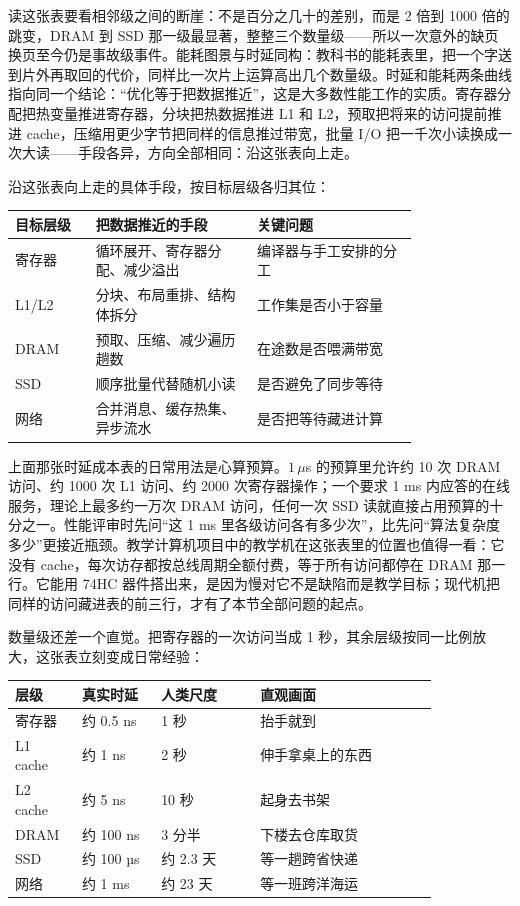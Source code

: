读这张表要看相邻级之间的断崖：不是百分之几十的差别，而是 2 倍到 1000 倍的跳变，DRAM 到 SSD 那一级最显著，整整三个数量级——所以一次意外的缺页换页至今仍是事故级事件。能耗图景与时延同构：教科书的能耗表里，把一个字送到片外再取回的代价，同样比一次片上运算高出几个数量级。时延和能耗两条曲线指向同一个结论：“优化等于把数据推近”，这是大多数性能工作的实质。寄存器分配把热变量推进寄存器，分块把热数据推进 L1 和 L2，预取把将来的访问提前推进 cache，压缩用更少字节把同样的信息推过带宽，批量 I/O 把一千次小读换成一次大读——手段各异，方向全部相同：沿这张表向上走。

沿这张表向上走的具体手段，按目标层级各归其位：

\begin{longtable}{L{0.16\linewidth}L{0.32\linewidth}L{0.32\linewidth}}
\toprule
目标层级 & 把数据推近的手段 & 关键问题 \\
\midrule
寄存器 & 循环展开、寄存器分配、减少溢出 & 编译器与手工安排的分工 \\\tablerowrule
L1/L2 & 分块、布局重排、结构体拆分 & 工作集是否小于容量 \\\tablerowrule
DRAM & 预取、压缩、减少遍历趟数 & 在途数是否喂满带宽 \\\tablerowrule
SSD & 顺序批量代替随机小读 & 是否避免了同步等待 \\\tablerowrule
网络 & 合并消息、缓存热集、异步流水 & 是否把等待藏进计算 \\
\bottomrule
\end{longtable}

上面那张时延成本表的日常用法是心算预算。$1\,\mu$s 的预算里允许约 10 次 DRAM 访问、约 1000 次 L1 访问、约 2000 次寄存器操作；一个要求 1 ms 内应答的在线服务，理论上最多约一万次 DRAM 访问，任何一次 SSD 读就直接占用预算的十分之一。性能评审时先问“这 1 ms 里各级访问各有多少次”，比先问“算法复杂度多少”更接近瓶颈。教学计算机项目中的教学机在这张表里的位置也值得一看：它没有 cache，每次访存都按总线周期全额付费，等于所有访问都停在 DRAM 那一行。它能用 74HC 器件搭出来，是因为慢对它不是缺陷而是教学目标；现代机把同样的访问藏进表的前三行，才有了本节全部问题的起点。

数量级还差一个直觉。把寄存器的一次访问当成 1 秒，其余层级按同一比例放大，这张表立刻变成日常经验：

\begin{longtable}{L{0.12\linewidth}L{0.16\linewidth}L{0.20\linewidth}L{0.36\linewidth}}
\toprule
层级 & 真实时延 & 人类尺度 & 直观画面 \\
\midrule
寄存器 & 约 0.5 ns & 1 秒 & 抬手就到 \\\tablerowrule
L1 cache & 约 1 ns & 2 秒 & 伸手拿桌上的东西 \\\tablerowrule
L2 cache & 约 5 ns & 10 秒 & 起身去书架 \\\tablerowrule
DRAM & 约 100 ns & 3 分半 & 下楼去仓库取货 \\\tablerowrule
SSD & 约 100 µs & 约 2.3 天 & 等一趟跨省快递 \\\tablerowrule
网络 & 约 1 ms & 约 23 天 & 等一班跨洋海运 \\
\bottomrule
\end{longtable}

